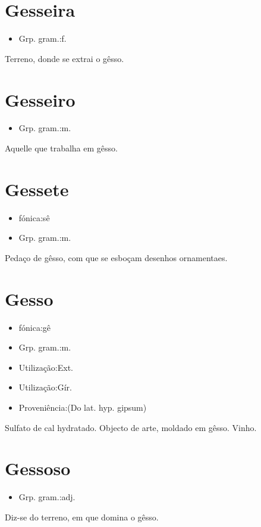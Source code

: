 \section{Gesseira}
\begin{itemize}
\item {Grp. gram.:f.}
\end{itemize}
Terreno, donde se extrai o gêsso.
\section{Gesseiro}
\begin{itemize}
\item {Grp. gram.:m.}
\end{itemize}
Aquelle que trabalha em gêsso.
\section{Gessete}
\begin{itemize}
\item {fónica:sê}
\end{itemize}
\begin{itemize}
\item {Grp. gram.:m.}
\end{itemize}
Pedaço de gêsso, com que se esboçam desenhos ornamentaes.
\section{Gesso}
\begin{itemize}
\item {fónica:gê}
\end{itemize}
\begin{itemize}
\item {Grp. gram.:m.}
\end{itemize}
\begin{itemize}
\item {Utilização:Ext.}
\end{itemize}
\begin{itemize}
\item {Utilização:Gír.}
\end{itemize}
\begin{itemize}
\item {Proveniência:(Do lat. hyp. \textunderscore gipsum\textunderscore )}
\end{itemize}
Sulfato de cal hydratado.
Objecto de arte, moldado em gêsso.
Vinho.
\section{Gessoso}
\begin{itemize}
\item {Grp. gram.:adj.}
\end{itemize}
Diz-se do terreno, em que domina o gêsso.
